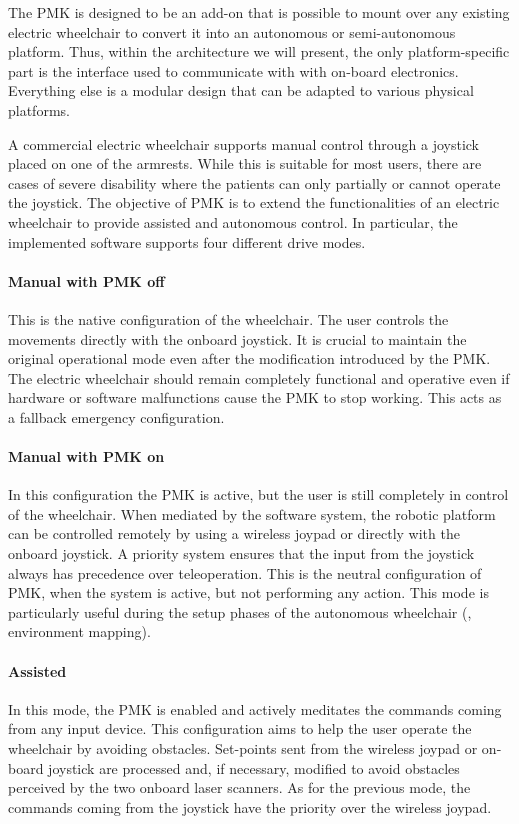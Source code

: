 The PMK is designed to be an add-on that is possible to mount over any existing electric wheelchair to convert it into an autonomous or semi-autonomous platform. Thus, within the architecture we will present, the only platform-specific part is the interface used to communicate with with on-board electronics. Everything else is a modular design that can be adapted to various physical platforms.

A commercial electric wheelchair supports manual control through a joystick placed on one of the armrests. While this is suitable for most users, there are cases of severe disability where the patients can only partially or cannot operate the joystick. The objective of PMK is to extend the functionalities of an electric wheelchair to provide assisted and autonomous control. In particular, the implemented software supports four different drive modes.

\paragraph{Manual with PMK off} This is the native configuration of the wheelchair. The user controls the movements directly with the onboard joystick. It is crucial to maintain the original operational mode even after the modification introduced by the PMK. The electric wheelchair should remain completely functional and operative even if hardware or software malfunctions cause the PMK to stop working. This acts as a fallback emergency configuration.
\paragraph{Manual with PMK on} In this configuration the PMK is active, but the user is still completely in control of the wheelchair. When mediated by the software system, the robotic platform can be controlled remotely by using a wireless joypad or directly with the onboard joystick. A priority system ensures that the input from the joystick always has precedence over teleoperation. This is the neutral configuration of PMK, when the system is active, but not performing any action. This mode is particularly useful during the setup phases of the autonomous wheelchair (\eg, environment mapping).
\paragraph{Assisted} In this mode, the PMK is enabled and actively meditates the commands coming from any input device. This configuration aims to help the user operate the wheelchair by avoiding obstacles. Set-points sent from the wireless joypad or on-board joystick are processed and, if necessary, modified to avoid obstacles perceived by the two onboard laser scanners. As for the previous mode, the commands coming from the joystick have the priority over the wireless joypad.
